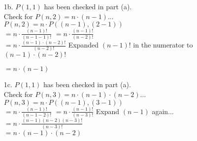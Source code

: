 {\begin{enumerate}
        \item[1b.]      $P(1,1)$ has been checked in part (a). \\

                        Check for $P(n,2) = n \cdot (n-1)$... \\
                        $P(n,2) = n \cdot P( (n-1), (2-1) )$ \\
                        $ = n \cdot \frac{ (n-1)! }{ (n-1-1)! } $ \tab
                        $ = n \cdot \frac{ (n-1)! }{ (n-2)! } $ \\
                        $ = n \cdot \frac{ (n-1) \cdot (n-2)! }{ (n-2)! } $ \tab
                        \small 
                        Expanded $(n-1)!$ in the numerator to $(n-1) \cdot (n-2)!$
                        \normalsize

                        $ = n \cdot (n-1)$ \checkmark 
                        
        \item[1c.]      $P(1,1)$ has been checked in part (a). \\

                        Check for $P(n,3) = n \cdot (n-1) \cdot (n-2)$... \\
                        $P(n,3) = n \cdot P( (n-1), (3-1) )$ \\
                        $ = n \cdot \frac{ (n-1)! }{ (n-1-2)! } $ \tab
                        $ = n \cdot \frac{ (n-1)! }{ (n-3)! } $ \tab Expand $(n-1)$ again... \\
                        $ = n \cdot \frac{ (n-1)(n-2)(n-3)! }{ (n-3)! } $ \\
                        $ = n \cdot (n-1) \cdot (n-2) $ \checkmark
    \end{enumerate}

}


